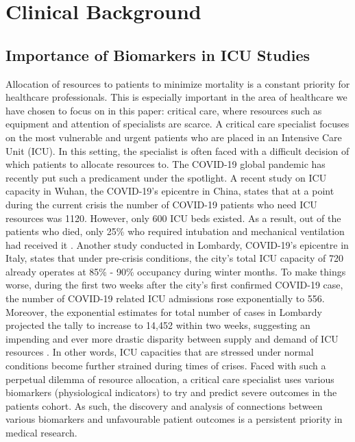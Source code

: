 
\chapter{Clinical Background} %

\label{chapter1} %


\section{Importance of Biomarkers in ICU Studies}

Allocation of resources to patients to minimize mortality is a constant priority for healthcare professionals. This is especially important in the area of healthcare we have chosen to focus on in this paper: critical care,  where resources such as equipment and attention of specialists are  scarce. A critical care specialist focuses on the most vulnerable and urgent patients who are placed in an Intensive Care Unit (ICU). In this setting, the specialist is often faced with a difficult decision of which patients to allocate resources to.
The COVID-19 global pandemic has recently put such a predicament under the spotlight. A recent study on ICU capacity in Wuhan, the COVID-19's epicentre in China, states that at a point during the current crisis the number of COVID-19 patients who need ICU resources was 1120. However, only 600 ICU beds existed. As a result, out of the patients who died, only 25\% who required intubation and mechanical ventilation had received it \citep{wu2020characteristics}. Another study conducted in Lombardy, COVID-19's epicentre in Italy, states that under pre-crisis conditions,  the city's  total ICU capacity of 720 already operates at 85\% - 90\% occupancy during winter months. To make things worse, during the first two weeks after the city's first confirmed COVID-19 case, the number of COVID-19 related ICU admissions rose exponentially to 556. Moreover, the exponential estimates for total number of cases in Lombardy projected the tally to increase to 14,452 within two weeks, suggesting an impending and ever more drastic disparity between supply and demand of ICU resources \citep{grasselli2020}. In other words, ICU capacities that are stressed under normal conditions become further strained during times of crises. Faced with such a perpetual dilemma of resource allocation, a critical care specialist uses various biomarkers (physiological indicators) to try and predict severe outcomes in the patients cohort. As such, the discovery and analysis of connections between various biomarkers and unfavourable patient outcomes is a persistent priority in medical research\citep{ware2017biomarkers}. 

